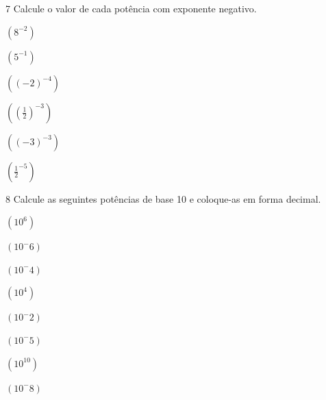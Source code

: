 \num{7} Calcule o valor de cada potência com exponente negativo.

\begin{escolha}[itemsep=0pt]
\item $(8^{-2})$ 
             
\item $(5^{-1})$ 
            
\item $((-2)^{-4})$
            
\item $((\frac{1}{2})^{-3}) $
           
\item $((-3)^{-3})$
            
\item $(\frac{1}{2}^{-5})$
            
\end{escolha}


\num{8} Calcule as seguintes potências de base 10 e coloque-as em forma
decimal.

\begin{escolha}[itemsep=0pt]
\item $(10^6)$
   
\item $(10^-6)$
   
\item $(10^-4)$
   
\item $(10^4)$
   
\item $(10^-2)$
   
\item $(10 ^-5)$
   
\item $(10^10)$
   
\item $(10^-8)$
   
\end{escolha}


